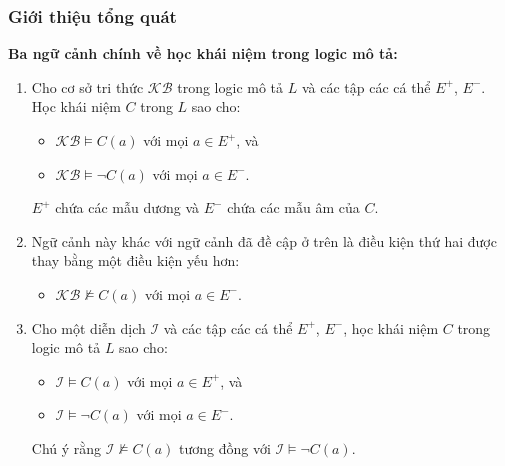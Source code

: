 \documentclass[fleqn]{beamer}
\newcommand{\mI}		{\mathcal{I}}
\newcommand{\KB}		{\mathcal{KB}}
\begin{document}
\begin{frame}\frametitle{\bf Giới thiệu tổng quát}
{\bf Ba ngữ cảnh chính về học khái niệm trong logic mô tả:}
\vspace{1.0ex}
%
\begin{enumerate}[(1)]
  \item\label{setting1} Cho cơ sở tri thức $\KB$ trong logic mô tả $L$ và các tập các cá thể $E^+$, $E^-$. Học khái niệm $C$ trong $L$ sao cho:
  \begin{itemize}
    \item $\KB \models C(a)$ với mọi $a \in E^+$, và
    \vspace{1.0ex}
    \item $\KB \models \lnot C(a)$ với mọi $a \in E^-$. 
  \end{itemize}
  $E^+$ chứa các mẫu dương và $E^-$ chứa các mẫu âm của $C$.

  \vspace{1.0ex}
  \item\label{setting2} Ngữ cảnh này khác với ngữ cảnh đã đề cập ở trên là điều kiện thứ hai được thay bằng một điều kiện yếu hơn:
  \vspace{1.0ex}
  \begin{itemize}
    \item $\KB \not\models C(a)$ với mọi $a \in E^-$.
  \end{itemize}

  \vspace{1.0ex}
  \item\label{setting3} Cho một diễn dịch $\mI$ và các tập các cá thể $E^+$, $E^-$, học khái niệm $C$ trong logic mô tả $L$ sao cho:
  \vspace{1.0ex}
  \begin{itemize}
    \item $\mI \models C(a)$ với mọi $a \in E^+$, và
    \item $\mI \models \lnot C(a)$ với mọi $a \in E^-$.
  \end{itemize}
  \vspace{1.0ex}
Chú ý rằng $\mI \not\models C(a)$ tương đồng với $\mI \models \lnot C(a)$.
\end{enumerate}
\end{frame}
\end{document}
